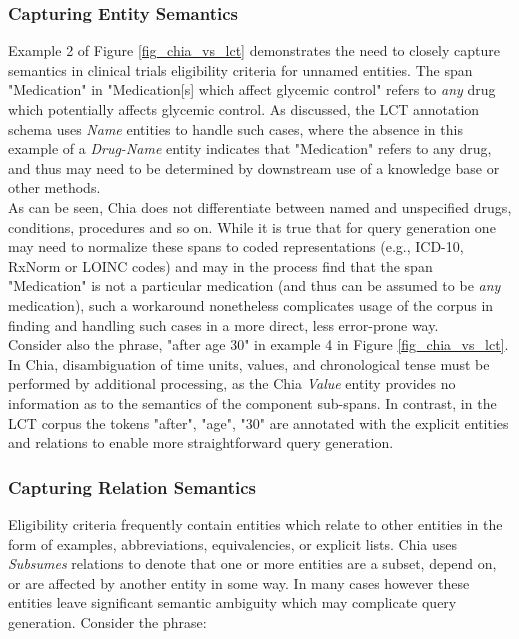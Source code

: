 \documentclass[fleqn,10pt]{wlscirep}
\begin{document}
\subsubsection*{Capturing Entity Semantics}
\noindent Example 2 of Figure \ref{fig_chia_vs_lct} demonstrates the need to closely capture semantics in clinical trials eligibility criteria for unnamed entities. The span "Medication" in "Medication[s] which affect glycemic control" refers to \textit{any} drug which potentially affects glycemic control. As discussed, the LCT annotation schema uses \textit{Name} entities to handle such cases, where the absence in this example of a \textit{Drug-Name} entity indicates that "Medication" refers to any drug, and thus may need to be determined by downstream use of a knowledge base or other methods. \\

\noindent As can be seen, Chia does not differentiate between named and unspecified drugs, conditions, procedures and so on. While it is true that for query generation one may need to normalize these spans to coded representations (e.g., ICD-10, RxNorm or LOINC codes) and may in the process find that the span "Medication" is not a particular medication (and thus can be assumed to be \textit{any} medication), such a workaround nonetheless complicates usage of the corpus in finding and handling such cases in a more direct, less error-prone way. \\

\noindent Consider also the phrase, "after age 30" in example 4 in Figure \ref{fig_chia_vs_lct}. In Chia, disambiguation of time units, values, and chronological tense must be performed by additional processing, as the Chia \textit{Value} entity provides no information as to the semantics of the component sub-spans. In contrast, in the LCT corpus the tokens "after", "age", "30" are annotated with the explicit entities and relations to enable more straightforward query generation. \\

\subsubsection*{Capturing Relation Semantics}
Eligibility criteria frequently contain entities which relate to other entities in the form of examples, abbreviations, equivalencies, or explicit lists. Chia uses \textit{Subsumes} relations to denote that one or more entities are a subset, depend on, or are affected by another entity in some way. In many cases however these entities leave significant semantic ambiguity which may complicate query generation. Consider the phrase:
\end{document}
